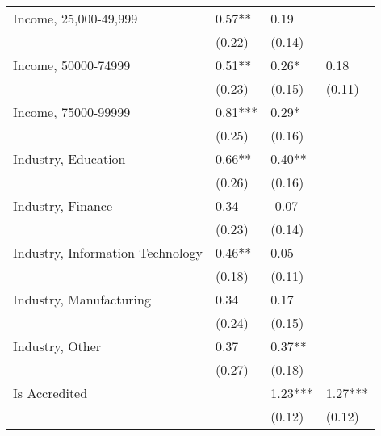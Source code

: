 \begin{table}
\begin{center}
\begin{tabular}{llll}
    Income, 25,000-49,999                           & 0.57**                 & 0.19         &                \\
                                                   & (0.22)                 & (0.14)       &                \\
    Income, 50000-74999                           & 0.51**                 & 0.26*        & 0.18           \\
                                                   & (0.23)                 & (0.15)       & (0.11)         \\
    Income, 75000-99999                           & 0.81***                & 0.29*        &                \\
                                                   & (0.25)                 & (0.16)       &                \\
    Industry, Education                            & 0.66**                 & 0.40**       &                \\
                                                   & (0.26)                 & (0.16)       &                \\
    Industry, Finance                              & 0.34                   & -0.07        &                \\
                                                   & (0.23)                 & (0.14)       &                \\
    Industry, Information Technology              & 0.46**                 & 0.05         &                \\
                                                   & (0.18)                 & (0.11)       &                \\
    Industry, Manufacturing                        & 0.34                   & 0.17         &                \\
                                                   & (0.24)                 & (0.15)       &                \\
    Industry, Other                                & 0.37                   & 0.37**       &                \\
                                                   & (0.27)                 & (0.18)       &                \\
    Is Accredited                                 &                        & 1.23***      & 1.27***        \\
                                                   &                        & (0.12)       & (0.12)         \\

\end{tabular}
\end{center}
\end{table}
